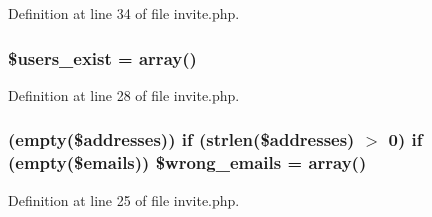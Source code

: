 Definition at line 34 of file invite.\+php.

\subsubsection[{\texorpdfstring{\$users\+\_\+exist}{$users_exist}}]{\setlength{\rightskip}{0pt plus 5cm}\$users\+\_\+exist = array()}\hypertarget{actions_2invite_8php_ac2dd584e09b60032ab474d13e1f5816d}{}\label{actions_2invite_8php_ac2dd584e09b60032ab474d13e1f5816d}


Definition at line 28 of file invite.\+php.

\subsubsection[{\texorpdfstring{\$wrong\+\_\+emails}{$wrong_emails}}]{ (empty(\$addresses)) {\bf if} (strlen(\$addresses) $>$ 0) {\bf if} (empty(\$emails)) \$wrong\+\_\+emails = array()}\hypertarget{actions_2invite_8php_a0ba6bb4c55084a54da885773a3abb418}{}\label{actions_2invite_8php_a0ba6bb4c55084a54da885773a3abb418}


Definition at line 25 of file invite.\+php.

